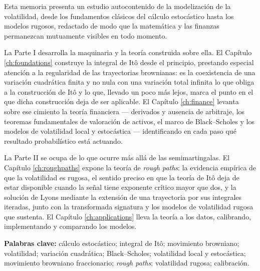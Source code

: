 \vspace{0.2cm}

Esta memoria presenta un estudio autocontenido de la modelizaci\'on de la volatilidad, desde los
fundamentos cl\'asicos del c\'alculo estoc\'astico hasta los modelos rugosos,
redactado de modo que la matem\'atica y las finanzas permanezcan mutuamente visibles en todo momento.

La Parte I desarrolla la maquinaria y la teor\'ia construida sobre ella. El Cap\'itulo
\ref{ch:foundations} construye la integral de Itô desde el principio, prestando especial atenci\'on
a la regularidad de las trayectorias brownianas: es la coexistencia de una variaci\'on cuadr\'atica
finita y no nula con una variaci\'on total infinita lo que obliga a la construcci\'on de Itô y lo
que, llevado un poco m\'as lejos, marca el punto en el que dicha construcci\'on deja de ser
aplicable. El Cap\'itulo \ref{ch:finance} levanta sobre ese cimiento la teor\'ia financiera
--- derivados y ausencia de arbitraje, los teoremas fundamentales de valoraci\'on de activos, el
marco de Black--Scholes y los modelos de volatilidad local y estoc\'astica --- identificando en cada paso qu\'e resultado probabil\'istico est\'a actuando.

La Parte II se ocupa de lo que ocurre m\'as all\'a de las semimartingalas. El
Cap\'itulo \ref{ch:roughpaths} expone la teor\'ia de \emph{rough paths}: la evidencia emp\'irica de
que la volatilidad es rugosa, el sentido preciso en que la teor\'ia de Itô deja de estar disponible
cuando la se\~nal tiene exponente cr\'itico mayor que dos, y la soluci\'on de Lyons
mediante la extensi\'on de una trayectoria por sus integrales iteradas, junto con la transformada
signatura y los modelos de volatilidad rugosa que sustenta. El Cap\'itulo \ref{ch:applications}
lleva la teor\'ia a los datos, calibrando, implementando y comparando los modelos.





\noindent\textbf{Palabras clave:} c\'alculo estoc\'astico; integral de Itô; movimiento browniano;
 volatilidad; variaci\'on cuadr\'atica; Black--Scholes; volatilidad local y estoc\'astica; movimiento
browniano fraccionario; \emph{rough paths}; volatilidad rugosa; calibraci\'on.

\newpage
